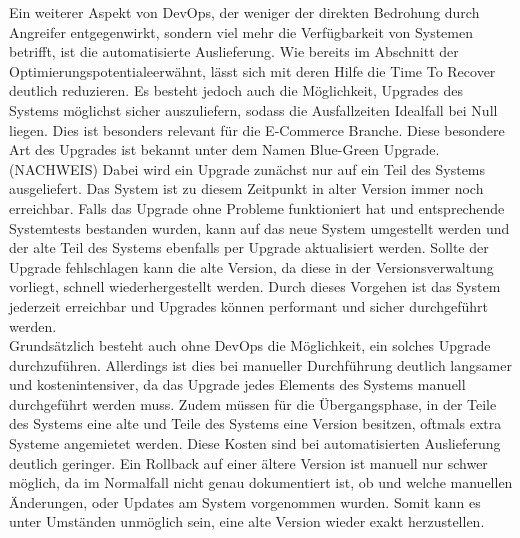 Ein weiterer Aspekt von DevOps, der weniger der direkten Bedrohung durch Angreifer entgegenwirkt, sondern viel mehr die Verfügbarkeit von Systemen betrifft, ist die automatisierte Auslieferung. Wie bereits im Abschnitt der \glqq Optimierungspotentiale\grqq erwähnt, lässt sich mit deren Hilfe die Time To Recover deutlich reduzieren. Es besteht jedoch auch die Möglichkeit, Upgrades des Systems möglichst sicher auszuliefern, sodass die Ausfallzeiten Idealfall bei Null liegen. Dies ist besonders relevant für die E-Commerce Branche. Diese besondere Art des Upgrades ist bekannt unter dem Namen \glqq Blue-Green Upgrade\grqq. (NACHWEIS) Dabei wird ein Upgrade zunächst nur auf ein Teil des Systems ausgeliefert. Das System ist zu diesem Zeitpunkt in alter Version immer noch erreichbar. Falls das Upgrade ohne Probleme funktioniert hat und entsprechende Systemtests bestanden wurden, kann auf das neue System umgestellt werden und der alte Teil des Systems ebenfalls per Upgrade aktualisiert werden. Sollte der Upgrade fehlschlagen kann die alte Version, da diese in der Versionsverwaltung vorliegt, schnell wiederhergestellt werden. Durch dieses Vorgehen ist das System jederzeit erreichbar und Upgrades können performant und sicher durchgeführt werden.\\
Grundsätzlich besteht auch ohne DevOps die Möglichkeit, ein solches Upgrade durchzuführen. Allerdings ist dies bei manueller Durchführung deutlich langsamer und kostenintensiver, da das Upgrade jedes Elements des Systems manuell durchgeführt werden muss. Zudem müssen für die Übergangsphase, in der Teile des Systems eine alte und Teile des Systems eine Version besitzen, oftmals extra Systeme angemietet werden. Diese Kosten sind bei automatisierten Auslieferung deutlich geringer. Ein Rollback auf einer ältere Version ist manuell nur schwer möglich, da im Normalfall nicht genau dokumentiert ist, ob und welche manuellen Änderungen, oder Updates am System vorgenommen wurden. Somit kann es unter Umständen unmöglich sein, eine alte Version wieder exakt herzustellen.\\

